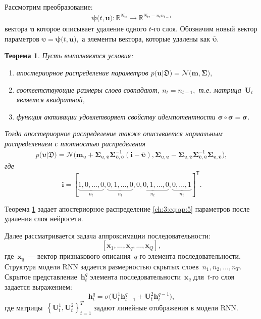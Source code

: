 \documentclass{dissert}
\newtheorem{theorem}{Теорема}
\begin{document}
Рассмотрим преобразование:
\[
\label{ch:3:eq:ap:4}
\begin{aligned}
\bm{\psi}\bigr(t, \mathbf{u}\bigr) : \mathbb{R}^{N_{\text{tr}}} \to \mathbb{R}^{N_{\text{tr}}-n_tn_{t-1}}
\end{aligned}
\]
вектора $\mathbf{u}$ которое описывает удаление одного $t$-го слоя.
Обозначим новый вектор параметров $\bm{\upsilon} = \bm{\psi}\bigr(t, \mathbf{u}\bigr),$ а элементы вектора, которые удалены как $\bar{\bm{\upsilon}}.$ 

\begin{theorem}
\label{theorem:ap:layer}
Пусть выполняются условия:
\begin{enumerate}[1)]
\item апостериорное распределение параметров $p\bigr(\mathbf{u}|\mathfrak{D}\bigr) = \mathcal{N}\bigr(\mathbf{m}, \bm{\Sigma}\bigr),$
\item соответствующие размеры слоев совпадают, $n_t=n_{t-1},$ т.е. матрица~$\mathbf{U}_t$ является квадратной,
\item функция активации удовлетворяет свойству идемпотентности $\bm{\sigma} \circ \bm{\sigma} = \bm{\sigma}$.
\end{enumerate}
Тогда апостериорное распределение также описывается нормальным распределением с плотностью распределения
\[
\label{ch:3:eq:ap:5}
\begin{aligned}
p\bigr(\bm{\upsilon}|\mathfrak{D}\bigr) = \mathcal{N}\bigr(\mathbf{m}_{\bm{\upsilon}}+\bm{\Sigma}_{\bm{\upsilon},\bar{\bm{\upsilon}}} \bm{\Sigma}_{\bar{\bm{\upsilon}},\bar{\bm{\upsilon}}}^{-1} \left(\mathbf{i} - \bar{\bm{\upsilon}}\right), \bm{\Sigma}_{\bm{\upsilon},\bm{\upsilon}} - \bm{\Sigma}_{\bm{\upsilon},\bar{\bm{\upsilon}}}\bm{\Sigma}_{\bar{\bm{\upsilon}},\bar{\bm{\upsilon}}}^{-1}\bm{\Sigma}_{\bm{\upsilon},\bar{\bm{\upsilon}}}\bigr),
\end{aligned}
\]
где
\[
\mathbf{i}=[\underbrace{1, 0, \ldots, 0}_{n_t}, \underbrace{0, 1, \ldots, 0}_{n_t}, \underbrace{0, 0, 1, \ldots, 0}_{n_t}, \underbrace{0, \ldots, 1}_{n_t}]^{\mathsf{T}}.
\]
\end{theorem}
Теорема \ref{theorem:ap:layer} задает апостериорное распределение \eqref{ch:3:eq:ap:5} параметров после удаления слоя нейросети.

Далее рассматривается задача аппроксимации последовательности:
\[
    \left[\mathbf{x}_1, \ldots, \mathbf{x}_{q}, \ldots, \mathbf{x}_{Q}\right],
\]
где~$\mathbf{x}_{q}$~--- вектор признакового описания~$q$-го элемента последовательности. 
Структура модели RNN задается размерностью скрытых слоев~$n_1, n_2, \ldots, n_T.$ Скрытое представление~$\mathbf{h}^{q}_t$ элемента последовательности~$\mathbf{x}_{q}$ для~$t$-го слоя задается выражением:
\[
    \mathbf{h}^{q}_t = \sigma\bigr(\mathbf{U}^{1}_{t}\mathbf{h}^{q}_{t-1}+\mathbf{U}^{2}_{t}\mathbf{h}^{q-1}_{t}\bigr),
\]
где матрицы~$\left\{\mathbf{U}^{1}_{t}, \mathbf{U}^{2}_{t}\right\}_{t=1}^{T}$ задают линейные отображения в модели RNN.
\end{document}
